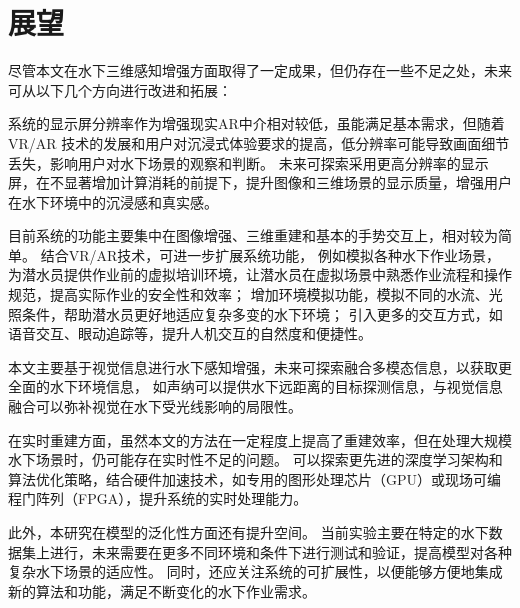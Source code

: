 \section{展望}
尽管本文在水下三维感知增强方面取得了一定成果，但仍存在一些不足之处，未来可从以下几个方向进行改进和拓展：

系统的显示屏分辨率作为增强现实AR中介相对较低，虽能满足基本需求，但随着 VR/AR 技术的发展和用户对沉浸式体验要求的提高，低分辨率可能导致画面细节丢失，影响用户对水下场景的观察和判断。
未来可探索采用更高分辨率的显示屏，在不显著增加计算消耗的前提下，提升图像和三维场景的显示质量，增强用户在水下环境中的沉浸感和真实感。

目前系统的功能主要集中在图像增强、三维重建和基本的手势交互上，相对较为简单。
结合VR/AR技术，可进一步扩展系统功能，
例如模拟各种水下作业场景，为潜水员提供作业前的虚拟培训环境，让潜水员在虚拟场景中熟悉作业流程和操作规范，提高实际作业的安全性和效率；
增加环境模拟功能，模拟不同的水流、光照条件，帮助潜水员更好地适应复杂多变的水下环境；
引入更多的交互方式，如语音交互、眼动追踪等，提升人机交互的自然度和便捷性。

本文主要基于视觉信息进行水下感知增强，未来可探索融合多模态信息，以获取更全面的水下环境信息，
如声纳可以提供水下远距离的目标探测信息，与视觉信息融合可以弥补视觉在水下受光线影响的局限性。

在实时重建方面，虽然本文的方法在一定程度上提高了重建效率，但在处理大规模水下场景时，仍可能存在实时性不足的问题。
可以探索更先进的深度学习架构和算法优化策略，结合硬件加速技术，如专用的图形处理芯片（GPU）或现场可编程门阵列（FPGA），提升系统的实时处理能力。

此外，本研究在模型的泛化性方面还有提升空间。
当前实验主要在特定的水下数据集上进行，未来需要在更多不同环境和条件下进行测试和验证，提高模型对各种复杂水下场景的适应性。
同时，还应关注系统的可扩展性，以便能够方便地集成新的算法和功能，满足不断变化的水下作业需求。


